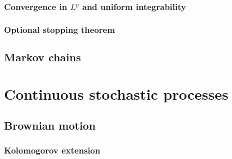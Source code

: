 \documentclass{../../large}
\begin{document}
\begin{prb}
\begin{parts}
\item
\end{parts}
\end{prb}

\begin{prb}
\begin{parts}
\item
\end{parts}
\end{prb}

\section{Convergence in $L^p$ and uniform integrability}

\section{Optional stopping theorem}



\chapter{Markov chains}







\part{Continuous stochastic processes}





\chapter{Brownian motion}
\section{Kolomogorov extension}
\end{document}

